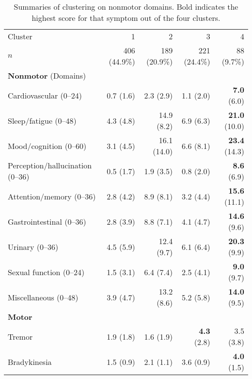 \documentclass[preprint,3p]{elsarticle} %
\begin{document}
\begin{table}[t]
  \centering
  \caption{Summaries of clustering on nonmotor domains. Bold indicates the highest score for that
  symptom out of the four clusters.}
  \label{tab:nmd}
  \begin{threeparttable}
  \begin{tabular}{l r r r r}
    \toprule
    Cluster & 1 & 2 & 3 & 4 \\
    $n$ & 406 (44.9\%) & 189 (20.9\%) & 221 (24.4\%) & 88 (9.7\%) \\
    \midrule
    \textbf{Nonmotor} (Domains) & & & & \\
    Cardiovascular (0--24) & 0.7 (1.6)\tnote{24} & 2.3 (2.9)\tnote{134} & 1.1 (2.0)\tnote{24} &
    \textbf{7.0} (6.0)\tnote{234} \\
    Sleep/fatigue (0--48) & 4.3 (4.8)\tnote{234} & 14.9 (8.2)\tnote{134} & 6.9 (6.3)\tnote{124}
    & \textbf{21.0} (10.0)\tnote{123} \\
    Mood/cognition (0--60) & 3.1 (4.5)\tnote{234} & 16.1 (14.0)\tnote{134} & 6.6
    (8.1)\tnote{124} & \textbf{23.4} (14.3)\tnote{123} \\
    Perception/hallucination (0--36) & 0.5 (1.7)\tnote{24} & 1.9 (3.5)\tnote{134} & 0.8
    (2.0)\tnote{24} & \textbf{8.6} (6.9)\tnote{123} \\
    Attention/memory (0--36) & 2.8 (4.2)\tnote{24} & 8.9 (8.1)\tnote{134} & 3.2 (4.4)\tnote{24} &
    \textbf{15.6} (11.1)\tnote{123} \\
    Gastrointestinal (0--36) & 2.8 (3.9)\tnote{234} & 8.8 (7.1)\tnote{134} & 4.1
    (4.7)\tnote{124} & \textbf{14.6} (9.6)\tnote{123} \\
    Urinary (0--36) & 4.5 (5.9)\tnote{234} & 12.4 (9.7)\tnote{134} & 6.1 (6.4)\tnote{124} &
    \textbf{20.3} (9.9)\tnote{123} \\
    Sexual function (0--24) & 1.5 (3.1)\tnote{24} & 6.4 (7.4)\tnote{134} & 2.5 (4.1)\tnote{24} &
    \textbf{9.0} (9.7)\tnote{123} \\
    Miscellaneous (0--48) & 3.9 (4.7)\tnote{24} & 13.2 (8.6)\tnote{13} & 5.2 (5.8)\tnote{24} &
    \textbf{14.0} (9.5)\tnote{13} \\
    \midrule
    \textbf{Motor} & & & & \\
    Tremor & 1.9 (1.8)\tnote{34} & 1.6 (1.9)\tnote{34} & \textbf{4.3} (2.8)\tnote{124} & 3.5
    (3.8)\tnote{123} \\
    Bradykinesia & 1.5 (0.9)\tnote{234} & 2.1 (1.1)\tnote{134} & 3.6 (0.9)\tnote{124} &
    \textbf{4.0} (1.5)\tnote{123} \\

\end{tabular}
\end{threeparttable}
\end{table}
\end{document}
